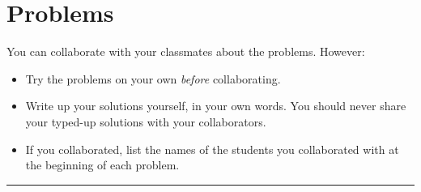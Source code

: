 \documentclass{article}
\begin{document}
\section*{Problems}

You can collaborate with your classmates about the problems. However:

\begin{itemize}
  \item Try the problems on your own \textit{before} collaborating.
  \item Write up your solutions yourself, in your own words.  You should never
    share your typed-up solutions with your collaborators.
  \item If you collaborated, list the names of the students you collaborated
    with at the beginning of each problem.
\end{itemize}

\noindent\rule{\linewidth}{1.0pt}
\end{document}
